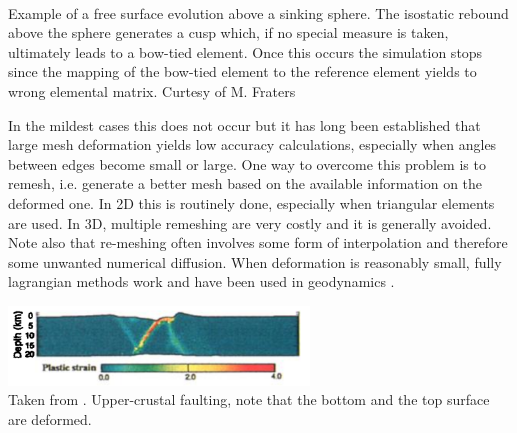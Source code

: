 \begin{center}
\\
{\tiny Example of a free surface evolution above a sinking sphere. The isostatic rebound above the sphere 
generates a cusp which, if no special measure is taken, ultimately leads to a bow-tied element. Once this 
occurs the simulation stops since the mapping of the bow-tied element to the reference element yields to
wrong elemental matrix. Curtesy of M. Fraters}
\end{center}

In the mildest cases this does not occur but it has long been established that 
large mesh deformation yields low accuracy calculations, 
especially when angles between edges become small or large. 
One way to overcome this problem is to remesh, i.e. generate a better mesh based on the 
available information on the deformed one. In 2D this is routinely done, especially when 
triangular elements are used. In 3D, multiple remeshing are very costly and it is generally
avoided.  
Note also that re-meshing often involves some form of interpolation and therefore some unwanted 
numerical diffusion. 
When deformation is reasonably small, fully lagrangian methods work and have been used in 
geodynamics \cite{hach96b,mera80,labp00}.

\begin{center}
\includegraphics[width=8cm]{images/freesurface/labp00}\\
{\small Taken from \cite{labp00}. Upper-crustal faulting, note that the bottom and the top surface are deformed.}
\end{center}


